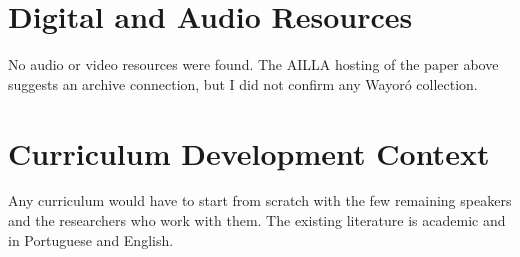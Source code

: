 \documentclass[12pt]{article}
\begin{document}
\section{Digital and Audio Resources}
No audio or video resources were found. The AILLA hosting of the paper above suggests an archive connection, but I did not confirm any Wayor\'o collection.

\section{Curriculum Development Context}
Any curriculum would have to start from scratch with the few remaining speakers and the researchers who work with them. The existing literature is academic and in Portuguese and English.
\end{document}
